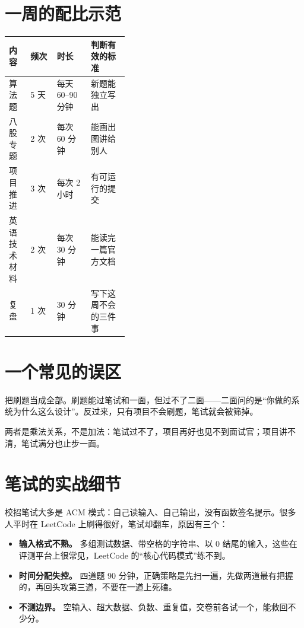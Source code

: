 \documentclass[UTF8,zihao=5,openany]{ctexbook}
\begin{document}
\section{一周的配比示范}
\begin{toolbox}
\begin{center}\small
\begin{tabularx}{0.92\linewidth}{p{0.18\linewidth}p{0.22\linewidth}YY}
\toprule
内容 & 频次 & 时长 & 判断有效的标准 \\
\midrule
算法题 & 5 天 & 每天 60--90 分钟 & 新题能独立写出 \\
八股专题 & 2 次 & 每次 60 分钟 & 能画出图讲给别人 \\
项目推进 & 3 次 & 每次 2 小时 & 有可运行的提交 \\
英语技术材料 & 2 次 & 每次 30 分钟 & 能读完一篇官方文档 \\
复盘 & 1 次 & 30 分钟 & 写下这周不会的三件事 \\
\bottomrule
\end{tabularx}
\end{center}
\end{toolbox}

\section{一个常见的误区}
把刷题当成全部。刷题能过笔试和一面，但过不了二面——二面问的是“你做的系统为什么这么设计”。反过来，只有项目不会刷题，笔试就会被筛掉。

两者是乘法关系，不是加法：笔试过不了，项目再好也见不到面试官；项目讲不清，笔试满分也止步一面。


\section{笔试的实战细节}
校招笔试大多是 ACM 模式：自己读输入、自己输出，没有函数签名提示。很多人平时在 LeetCode 上刷得很好，笔试却翻车，原因有三个：

\begin{itemize}
\item \textbf{输入格式不熟。} 多组测试数据、带空格的字符串、以 0 结尾的输入，这些在评测平台上很常见，LeetCode 的“核心代码模式”练不到。
\item \textbf{时间分配失控。} 四道题 90 分钟，正确策略是先扫一遍，先做两道最有把握的，再回头攻第三道，不要在一道上死磕。
\item \textbf{不测边界。} 空输入、超大数据、负数、重复值，交卷前各试一个，能救回不少分。
\end{itemize}
\end{document}
